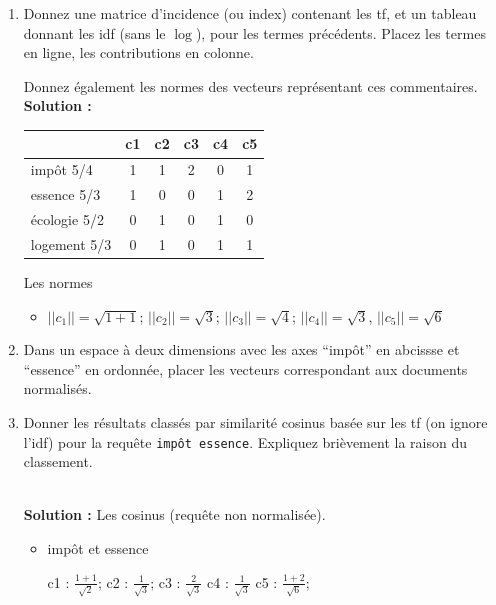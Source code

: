 \documentclass[11pt,a4paper]{article}
\newenvironment{solution}[0]{
~\\ \color{red} \textbf{Solution : }\color{black}}{%
}
\begin{document}
\begin{enumerate}
   \item Donnez une matrice d'incidence (ou index) contenant les tf, 
      et un tableau donnant les idf (sans le $\log$), pour les  termes précédents. Placez
      les termes en ligne, les contributions en colonne.

     Donnez également les normes des vecteurs représentant ces commentaires.
\begin{solution}
\begin{center}
\begin{tabular}{l|c|c|c|c|c}
            & \textbf{c1} & \textbf{c2} & \textbf{c3} &\textbf{c4}&\textbf{c5} \\ \hline  
   impôt  5/4   & 1           & 1           & 2           & 0         & 1\\
   essence 5/3  & 1           & 0           & 0           & 1         & 2\\
   écologie 5/2  & 0           & 1           & 0           & 1         & 0\\
   logement 5/3  & 0           & 1           & 0           & 1         & 1\\\hline
   \end{tabular}
\end{center}

Les normes
\begin{itemize}
  \item $||c_1|| = \sqrt{1+ 1}$; $||c_2|| = \sqrt{3}$; $||c_3|| = \sqrt{4}$; 
    $||c_4|| = \sqrt{3}$, $||c_5|| = \sqrt{6}$  
\end{itemize}
\end{solution}
  
  \item Dans un espace à deux dimensions avec les axes ``impôt'' en abcissse et ``essence'' en ordonnée,
       placer les vecteurs correspondant aux documents normalisés.
       
  \item Donner les résultats classés par similarité cosinus basée sur les tf 
  (on ignore l'idf) pour la requête \texttt{impôt essence}.
    Expliquez brièvement la raison  du classement.

\begin{solution}
Les cosinus (requête non normalisée).

\begin{itemize}
  \item  impôt et essence
  
    c1 : $\frac{1+1}{\sqrt{2}}$; 
    c2 : $\frac{1}{\sqrt{3}}$;
    c3 :  $\frac{2}{\sqrt{3}}$  
    c4 :  $\frac{1}{\sqrt{3}}$  
    c5 : $\frac{1+2}{\sqrt{6}}$; 
 \end{itemize}


\end{solution}
\end{enumerate}
\end{document}
